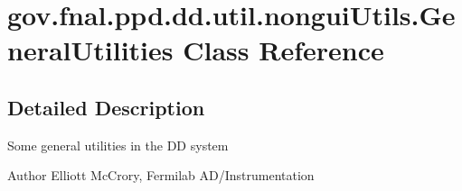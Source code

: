 \hypertarget{classgov_1_1fnal_1_1ppd_1_1dd_1_1util_1_1nonguiUtils_1_1GeneralUtilities}{\section{gov.\-fnal.\-ppd.\-dd.\-util.\-nongui\-Utils.\-General\-Utilities Class Reference}
\label{classgov_1_1fnal_1_1ppd_1_1dd_1_1util_1_1nonguiUtils_1_1GeneralUtilities}
}


\subsection{Detailed Description}
Some general utilities in the D\-D system

\begin{DoxyAuthor}{Author}
Elliott Mc\-Crory, Fermilab A\-D/\-Instrumentation 
\end{DoxyAuthor}
